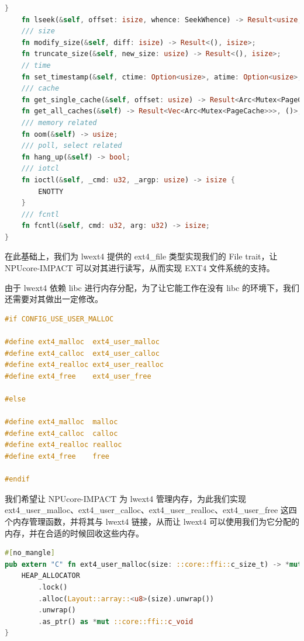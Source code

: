 \begin{lstlisting}[language={Rust}, caption={File trait}]
    }
    fn lseek(&self, offset: isize, whence: SeekWhence) -> Result<usize, isize>;
    /// size
    fn modify_size(&self, diff: isize) -> Result<(), isize>;
    fn truncate_size(&self, new_size: usize) -> Result<(), isize>;
    // time
    fn set_timestamp(&self, ctime: Option<usize>, atime: Option<usize>, mtime: Option<usize>);
    /// cache
    fn get_single_cache(&self, offset: usize) -> Result<Arc<Mutex<PageCache>>, ()>;
    fn get_all_caches(&self) -> Result<Vec<Arc<Mutex<PageCache>>>, ()>;
    /// memory related
    fn oom(&self) -> usize;
    /// poll, select related
    fn hang_up(&self) -> bool;
    /// iotcl
    fn ioctl(&self, _cmd: u32, _argp: usize) -> isize {
        ENOTTY
    }
    /// fcntl
    fn fcntl(&self, cmd: u32, arg: u32) -> isize;
}
\end{lstlisting}

在此基础上，我们为 lwext4 提供的 ext4_file 类型实现我们的 File trait，让 NPUcore-IMPACT 可以对其进行读写，从而实现 EXT4 文件系统的支持。

由于 lwext4 依赖 libc 进行内存分配，为了让它能工作在没有 libc 的环境下，我们还需要对其做出一定修改。

\begin{lstlisting}[language={C}, caption={管理 lwext4 内存}]
#if CONFIG_USE_USER_MALLOC

#define ext4_malloc  ext4_user_malloc
#define ext4_calloc  ext4_user_calloc
#define ext4_realloc ext4_user_realloc
#define ext4_free    ext4_user_free

#else

#define ext4_malloc  malloc
#define ext4_calloc  calloc
#define ext4_realloc realloc
#define ext4_free    free

#endif
\end{lstlisting}

我们希望让 NPUcore-IMPACT 为 lwext4 管理内存，为此我们实现 ext4_user_malloc、ext4_user_calloc、ext4_user_realloc、ext4_user_free 这四个内存管理函数，并将其与 lwext4 链接，从而让 lwext4 可以使用我们为它分配的内存，并在合适的时候回收这些内存。

\begin{lstlisting}[language={Rust}, caption={NPUcore-IMPACT 为 lwext4 分配内存}]
#[no_mangle]
pub extern "C" fn ext4_user_malloc(size: ::core::ffi::c_size_t) -> *mut ::core::ffi::c_void {
    HEAP_ALLOCATOR
        .lock()
        .alloc(Layout::array::<u8>(size).unwrap())
        .unwrap()
        .as_ptr() as *mut ::core::ffi::c_void
}
\end{lstlisting}

